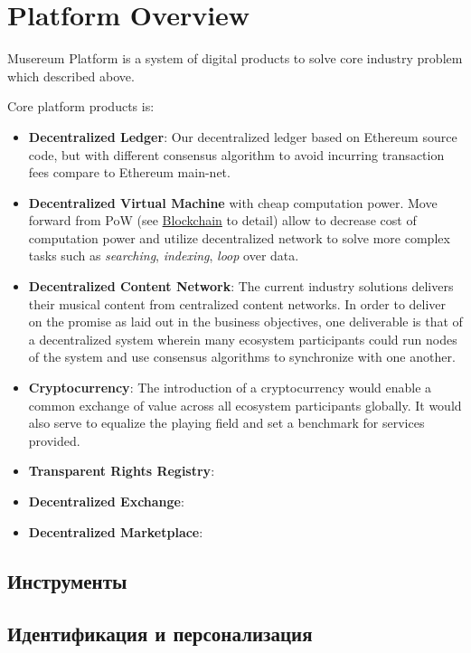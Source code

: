 \documentclass[12pt]{report}
\begin{document}
\chapter{Platform Overview}
\label{platform}
\begin{multicols}{2}
Musereum Platform is a system of digital products to solve core industry problem which described above.

Core platform products is:
\begin{itemize}
	\item \textbf{Decentralized Ledger}: Our decentralized ledger based on Ethereum source code, but with different consensus algorithm to avoid incurring transaction fees compare to Ethereum main-net.
	\item \textbf{Decentralized Virtual Machine} with cheap computation power. Move forward from PoW (see \hyperref[tech-blockchain]{Blockchain} to detail) allow to decrease cost of computation power and utilize decentralized network to solve more complex tasks such as \textit{searching}, \textit{indexing}, \textit{loop} over data.
	\item \textbf{Decentralized Content Network}: The current industry solutions  delivers their musical content from centralized content networks. In order to deliver on the promise as laid out in the business objectives, one deliverable is that of a decentralized system wherein many ecosystem participants could run nodes of the system and use consensus algorithms to synchronize
with one another.
	\item \textbf{Cryptocurrency}: The introduction of a cryptocurrency would enable a common exchange of value across all ecosystem participants globally. It would also serve to equalize the playing field and set a benchmark for services provided.
	\item \textbf{Transparent Rights Registry}:
	\item \textbf{Decentralized Exchange}:
	\item \textbf{Decentralized Marketplace}:
\end{itemize}
\end{multicols}
\section{Инструменты}

\section{Идентификация и персонализация}
\end{document}
